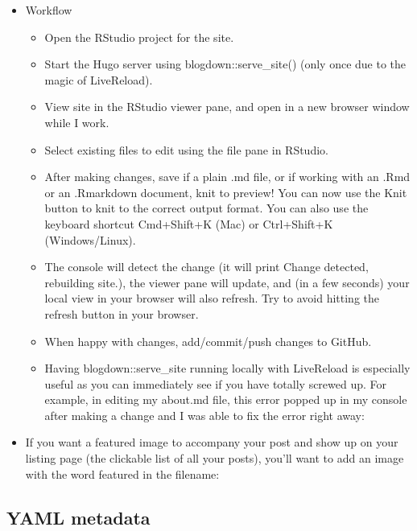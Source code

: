 \documentclass[
]{article}
\providecommand{\tightlist}{%
  \setlength{\itemsep}{0pt}\setlength{\parskip}{0pt}}
\begin{document}
\begin{itemize}
\tightlist
\item
  Workflow

  \begin{itemize}
  \tightlist
  \item
    Open the RStudio project for the site.
  \item
    Start the Hugo server using blogdown::serve\_site() (only once
    due to the magic of LiveReload).
  \item
    View site in the RStudio viewer pane, and open in a new browser
    window while I work.
  \item
    Select existing files to edit using the file pane in RStudio.
  \item
    After making changes, save if a plain .md file, or if working
    with an .Rmd or an .Rmarkdown document, knit to preview! You can
    now use the Knit button to knit to the correct output format.
    You can also use the keyboard shortcut Cmd+Shift+K (Mac) or
    Ctrl+Shift+K (Windows/Linux).
  \item
    The console will detect the change (it will print Change
    detected, rebuilding site.), the viewer pane will update, and
    (in a few seconds) your local view in your browser will also
    refresh. Try to avoid hitting the refresh button in your
    browser.
  \item
    When happy with changes, add/commit/push changes to GitHub.
  \item
    Having blogdown::serve\_site running locally with LiveReload is
    especially useful as you can immediately see if you have totally
    screwed up. For example, in editing my about.md file, this error
    popped up in my console after making a change and I was able to
    fix the error right away:
  \end{itemize}
\item
  If you want a featured image to accompany your post and show up on
  your listing page (the clickable list of all your posts), you'll
  want to add an image with the word featured in the filename:
\end{itemize}

\hypertarget{yaml-metadata}{%
\subsection{YAML metadata}\label{yaml-metadata}}
\end{document}
